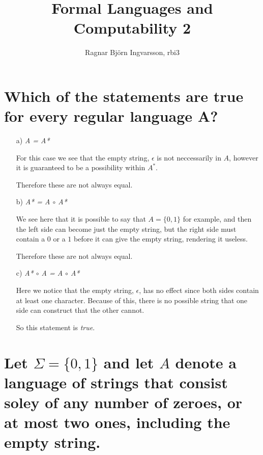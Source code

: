 \documentclass{article}
\title{Formal Languages and Computability 2}
\author{Ragnar Björn Ingvarsson, rbi3}
\begin{document}
\renewcommand\thepage{}
	
	\maketitle

	\newpage
	\setcounter{page}{1}
	\renewcommand\thepage{\arabic{page}}
	\section{Which of the statements are true for every regular language 
	A?}

	\begin{itemize}
		\item[a)]\textit{A = A*} 

			For this case we see that the empty string, $\epsilon$ is not 
			neccessarily in $A$, however it is guaranteed to be a 
			possibility within $A^*$. 

			Therefore these are not always equal.
		\item[b)]\textit{A* = A $\circ$ A*}

			We see here that it is possible to say that $A=\{0,1\}$ for 
			example, and then the left side can become just the empty 
			string, but the right side must contain a $0$ or a $1$ before 
			it can give the empty string, rendering it useless.

			Therefore these are not always equal.
		\item[c)]\textit{A* $\circ$ A = A $\circ$ A*}

			Here we notice that the empty string, $\epsilon$, has no effect 
			since both sides contain at least one character. Because of 
			this, there is no possible string that one side can construct 
			that the other cannot.

			So this statement is \textit{true}.
	\end{itemize}

	\section{Let $\Sigma=\{0,1\}$ and let $A$ denote a language of 
		strings that consist soley of any number of zeroes, or at most 
	two ones, including the empty string.}
\end{document}
